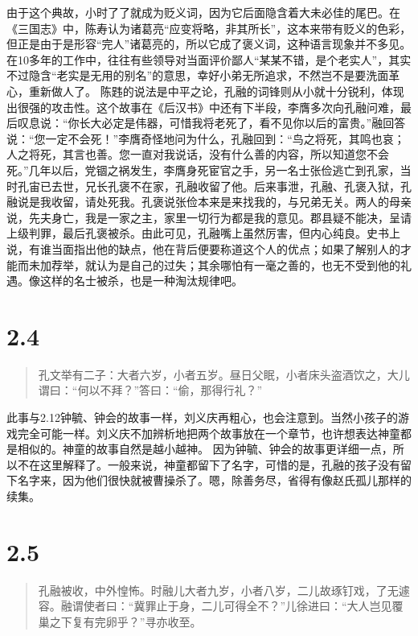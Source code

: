\documentclass[]{book}
\begin{document}
由于这个典故，小时了了就成为贬义词，因为它后面隐含着大未必佳的尾巴。在《三国志》中，陈寿认为诸葛亮``应变将略，非其所长''，这本来带有贬义的色彩，但正是由于是形容``完人''诸葛亮的，所以它成了褒义词，这种语言现象并不多见。在10多年的工作中，往往有些领导对当面评价鄙人``某某不错，是个老实人''，其实不过隐含``老实是无用的别名''的意思，幸好小弟无所追求，不然岂不是要洗面革心，重新做人了。
陈韪的说法是中平之论，孔融的词锋则从小就十分锐利，体现出很强的攻击性。这个故事在《后汉书》中还有下半段，李膺多次向孔融问难，最后叹息说：``你长大必定是伟器，可惜我将老死了，看不见你以后的富贵。''融回答说：``您一定不会死！''李膺奇怪地问为什么，孔融回到：``鸟之将死，其鸣也哀；人之将死，其言也善。您一直对我说话，没有什么善的内容，所以知道您不会死。''几年以后，党锢之祸发生，李膺身死宦官之手，另一名士张俭逃亡到孔家，当时孔宙已去世，兄长孔褒不在家，孔融收留了他。后来事泄，孔融、孔褒入狱，孔融说是我收留，请处死我。孔褒说张俭本来是来找我的，与兄弟无关。两人的母亲说，先夫身亡，我是一家之主，家里一切行为都是我的意见。郡县疑不能决，呈请上级判罪，最后孔褒被杀。由此可见，孔融嘴上虽然厉害，但内心纯良。史书上说，有谁当面指出他的缺点，他在背后便要称道这个人的优点；如果了解别人的才能而未加荐举，就认为是自己的过失；其余哪怕有一毫之善的，也无不受到他的礼遇。像这样的名士被杀，也是一种淘汰规律吧。

\section{2.4}\label{section-50}

\begin{quote}
孔文举有二子：大者六岁，小者五岁。昼日父眠，小者床头盗酒饮之，大儿谓曰：``何以不拜？''答曰：``偷，那得行礼？''
\end{quote}

此事与2.12钟毓、钟会的故事一样，刘义庆再粗心，也会注意到。当然小孩子的游戏完全可能一样。刘义庆不加辨析地把两个故事放在一个章节，也许想表达神童都是相似的。神童的故事自然是越小越神。
因为钟毓、钟会的故事更详细一点，所以不在这里解释了。一般来说，神童都留下了名字，可惜的是，孔融的孩子没有留下名字来，因为他们很快就被曹操杀了。嗯，除善务尽，省得有像赵氏孤儿那样的续集。

\section{2.5}\label{section-51}

\begin{quote}
孔融被收，中外惶怖。时融儿大者九岁，小者八岁，二儿故琢钉戏，了无遽容。融谓使者曰：``冀罪止于身，二儿可得全不？''儿徐进曰：``大人岂见覆巢之下复有完卵乎？''寻亦收至。
\end{quote}
\end{document}
